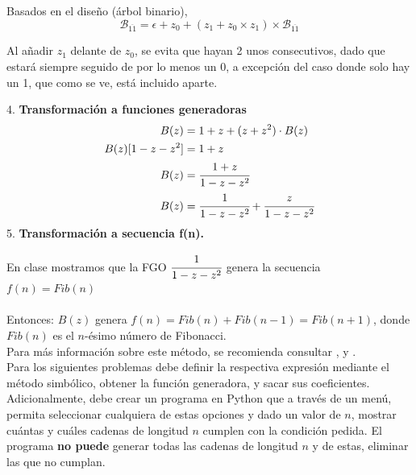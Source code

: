 Basados en el diseño (árbol binario), 
$$\mathcal{B}_{\overline{11}} = \epsilon  + z_0 + (z_1 + z_0\times z_1)\times\mathcal{B}_{\overline{11}}$$

Al añadir $z_1$ delante de $z_0$, se evita que hayan 2 unos consecutivos, dado que estará siempre seguido de por lo menos un 0, a excepción del caso donde solo hay un 1, que como se ve, está incluido aparte.

4. \textbf{Transformación a funciones generadoras}
\begin{equation*}
\begin{split}
   B(z) &= 1 + z + (z + z^2)\cdot B(z)\\
   B(z)[1 - z - z^2] &= 1 + z\\
   B(z) &= \cfrac{1+z}{1-z-z^2}\\
   B(z) &= \cfrac{1}{1-z-z^2}+\cfrac{z}{1-z-z^2}
\end{split}
\end{equation*}
5. \textbf{Transformación a secuencia f(n).}

En clase mostramos que la FGO $\cfrac{1}{1-z-z^2}$ genera la secuencia $f(n)=Fib(n)$ \\\\
Entonces:
$B(z)$ genera $f(n)=Fib(n)+Fib(n-1)=Fib(n+1)$, donde $Fib(n)$ es el $n$-ésimo número de Fibonacci.\\

Para más información sobre este método, se recomienda consultar \cite{sedgewick_introduction_2013}, \cite{lehman_generating_2010} y \cite{sedg-symb}.\\

\clearpage
Para los siguientes problemas debe definir la respectiva expresión mediante el método simbólico, obtener la función generadora, y sacar sus coeficientes. Adicionalmente, debe crear un programa en Python que a través de un menú, permita seleccionar cualquiera de estas opciones y dado un valor de $n$, mostrar {\color{cyan} cuántas y cuáles} cadenas de longitud $n$ cumplen con la condición pedida. {\color{red} El programa \textbf{no puede} generar todas las cadenas de longitud $n$ y de estas, eliminar las que no cumplan}.


